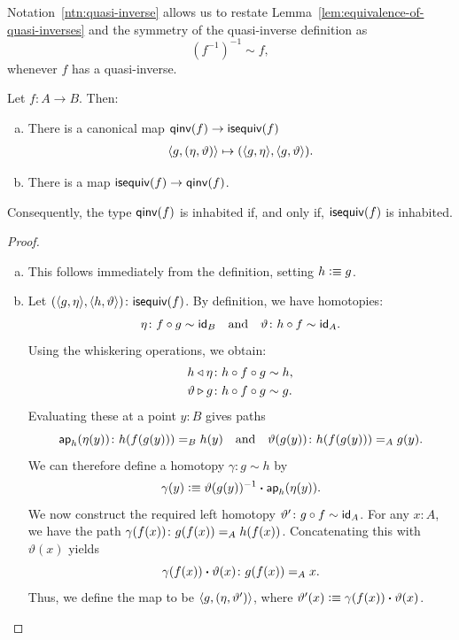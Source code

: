 \begin{rem}\label{rem:inverse-of-inverse-of-equivalence}
    Notation~\ref{ntn:quasi-inverse} allows us to restate Lemma~\ref{lem:equivalence-of-quasi-inverses} and the symmetry of the quasi-inverse definition as
    \[
        (f^{-1})^{-1}\sim f,
    \]
    whenever $f$ has a quasi-inverse.
\end{rem}



\begin{prop}\label{prop:qinv<->isequiv}
Let\/ $f\colon A\to B$. Then:
  \begin{enumerate}[a),font=\upshape]
    \item There is a canonical map\/ $\mathsf{qinv}(f)\to\mathsf{isequiv}(f)$
        \begin{align*}
            \langle g,(\eta,\vartheta)\rangle
                \mapsto(\langle g,\eta\rangle,\langle g,\vartheta\rangle).
        \end{align*}
    \item There is a map\/ $\mathsf{isequiv}(f)\to\mathsf{qinv}(f)$.
  \end{enumerate}
  Consequently, the type\/ $\mathsf{qinv}(f)$ is inhabited if, and only if, $\mathsf{isequiv}(f)$ is inhabited.
\end{prop}

\begin{proof}${}$
  \begin{enumerate}[a)]
    \item This follows immediately from the definition, setting $h \mathrel{\vcentcolon}\equiv g$.

    \item Let $(\dep{g,\eta},\dep{h,\vartheta})\colon\fun{isequiv}(f)$. By definition, we have homotopies:
    \[
      \eta\colon f\circ g\sim\id_B
      \quad\text{and}\quad
      \vartheta\colon h\circ f\sim\id_A.
    \]
    Using the whiskering operations, we obtain:
    \begin{align*}
      h\lwct\eta &\colon h\circ f\circ g\sim h, \\
      \vartheta\rwct g &\colon h\circ f\circ g\sim g.
    \end{align*}
    Evaluating these at a point $y\colon B$ gives paths
    \[
       \fun{ap}_h(\eta(y))\colon h(f(g(y)))\eq B h(y)
       \quad\text{and}\quad
       \vartheta(g(y))\colon h(f(g(y)))\eq A g(y).
    \]
    We can therefore define a homotopy $\gamma\colon g\sim h$ by
    \[
        \gamma(y) \mathrel{\vcentcolon}\equiv \vartheta(g(y))^{-1} \mathbin{\boldsymbol{\cdot}} \mathsf{ap}_h(\eta(y)).
    \]
    We now construct the required left homotopy $\vartheta'\colon g \circ f \sim \id_A$. For any $x\colon A$, we have the path $\gamma(f(x))\colon g(f(x))\eq A h(f(x))$. Concatenating this with $\vartheta(x)$ yields
    \[
      \gamma(f(x))\ct\vartheta(x)\colon g(f(x))\eq A x.
    \]
    Thus, we define the map to be $\langle g,(\eta,\vartheta')\rangle$, where $\vartheta'(x) \mathrel{\vcentcolon}\equiv \gamma(f(x))\mathbin{\boldsymbol{\cdot}}\vartheta(x)$.
  \end{enumerate}
\end{proof}

